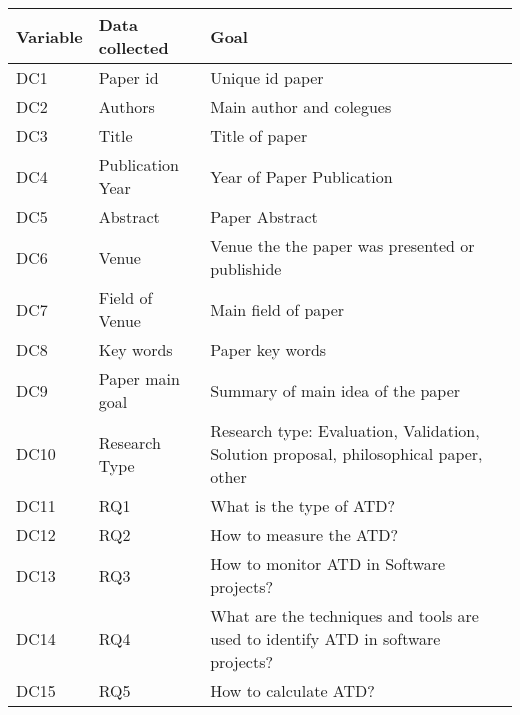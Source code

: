 \begin{tabular}{lll}
\toprule
Variable &    Data collected &                                                                                  Goal \\
\midrule
     DC1 &          Paper id &                                                                       Unique id paper \\
     DC2 &           Authors &                                                              Main author and colegues \\
     DC3 &             Title &                                                                        Title of paper \\
     DC4 &  Publication Year &                                                             Year of Paper Publication \\
     DC5 &          Abstract &                                                                        Paper Abstract \\
     DC6 &             Venue &                                       Venue the the paper was presented or publishide \\
     DC7 &    Field of Venue &                                                                   Main field of paper \\
     DC8 &         Key words &                                                                       Paper key words \\
     DC9 &   Paper main goal &                                                     Summary of main idea of the paper \\
    DC10 &     Research Type &  Research type: Evaluation, Validation, Solution proposal, philosophical paper, other \\
    DC11 &               RQ1 &                                                              What is the type of ATD? \\
    DC12 &               RQ2 &                                                               How to measure the ATD? \\
    DC13 &               RQ3 &                                              How to monitor ATD in Software projects? \\
    DC14 &               RQ4 &      What are the techniques and tools are used to identify ATD in software projects? \\
    DC15 &               RQ5 &                                                                 How to calculate ATD? \\
\bottomrule
\end{tabular}
